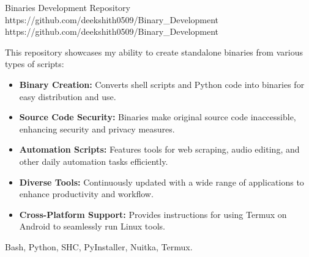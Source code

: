 \documentclass[a4paper,10pt]{article}
\makeatletter
\newcommand{\experienceentry}[5]{%
    \begin{tabularx}{\linewidth}{@{}l r@{}}
        \color{myblue} \textbf{#1} \hfill \color{mydarkblue} #2 \\[4pt]
        \color{mydarkblue} \textit{#3} \hfill \color{mylightpurple} \textit{#4} \\[5pt]
        \begin{minipage}[t]{\linewidth}
            #5
        \end{minipage}
    \end{tabularx}
}
\makeatother
\begin{document}
\vspace{10pt}


\projectentry
{Binaries Development Repository}
{https://github.com/deekshith0509/Binary_Development}
{https://github.com/deekshith0509/Binary_Development}
{This repository showcases my ability to create standalone binaries from various types of scripts:
\begin{itemize}
\item \textbf{Binary Creation:} Converts shell scripts and Python code into binaries for easy distribution and use.
\item \textbf{Source Code Security:} Binaries make original source code inaccessible, enhancing security and privacy measures.
\item \textbf{Automation Scripts:} Features tools for web scraping, audio editing, and other daily automation tasks efficiently.
\item \textbf{Diverse Tools:} Continuously updated with a wide range of applications to enhance productivity and workflow.
\item \textbf{Cross-Platform Support:} Provides instructions for using Termux on Android to seamlessly run Linux tools.
\end{itemize}
}{Bash, Python, SHC, PyInstaller, Nuitka, Termux.}

\vspace{8pt}
\fi   %





\newcommand{\experienceentry}[5]{%
    \begin{tabularx}{\linewidth}{@{} X r @{}}
        \color{myblue} \textbf{#1} & \color{mydarkblue} #2 \\
        \color{mydarkblue} \textbf{#3} & \color{mydarkblue} #4 \\
        \begin{minipage}[t]{\linewidth}
            \begin{itemize}[nosep, after=\strut, leftmargin=2em, itemsep=2pt]
                #5
            \end{itemize}
        \end{minipage}
    \end{tabularx}
    \vspace{10pt}
}

\titleformat{\section}{\Large\scshape\color{myblue}\centering}{}{0em}{}[\titlerule]
\titlespacing{\section}{0pt}{2pt}{2pt}
\end{document}
